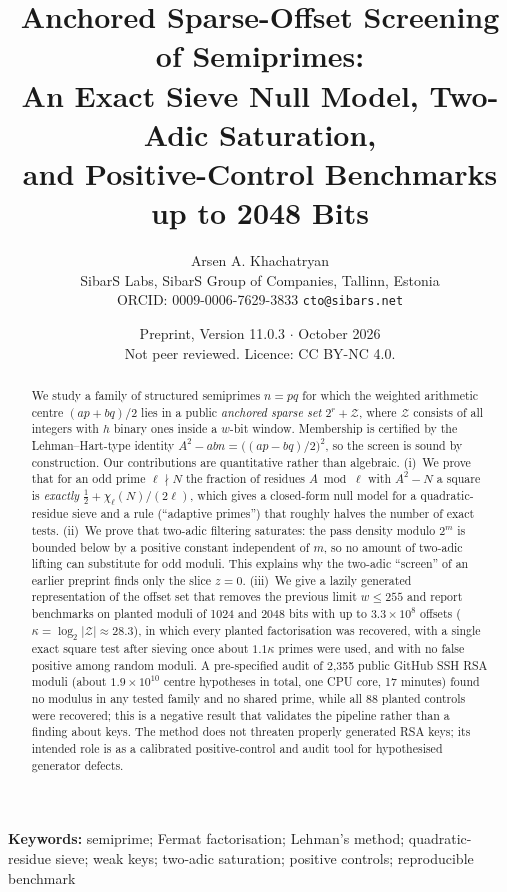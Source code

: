 \documentclass[11pt,a4paper]{article}
\title{\textbf{Anchored Sparse-Offset Screening of Semiprimes:\\
An Exact Sieve Null Model, Two-Adic Saturation,\\
and Positive-Control Benchmarks up to 2048 Bits}}
\author{Arsen A. Khachatryan\\
\small SibarS Labs, SibarS Group of Companies, Tallinn, Estonia\\
\small ORCID: 0009-0006-7629-3833 \quad \texttt{cto@sibars.net}}
\date{Preprint, Version 11.0.3 \quad $\cdot$ \quad 4 October 2026\\[2pt]
\small Not peer reviewed. Licence: CC BY-NC 4.0.}
\begin{document}
\maketitle


\begin{abstract}
We study a family of structured semiprimes $n=pq$ for which the weighted arithmetic centre $(ap+bq)/2$ lies in a public \emph{anchored sparse set} $2^r+\mathcal Z$, where $\mathcal Z$ consists of all integers with $h$ binary ones inside a $w$-bit window. Membership is certified by the Lehman--Hart-type identity $A^2-abn=\bigl((ap-bq)/2\bigr)^2$, so the screen is sound by construction. Our contributions are quantitative rather than algebraic. (i)~We prove that for an odd prime $\ell\nmid N$ the fraction of residues $A \bmod \ell$ with $A^2-N$ a square is \emph{exactly} $\tfrac12+\chi_\ell(N)/(2\ell)$, which gives a closed-form null model for a quadratic-residue sieve and a rule (``adaptive primes'') that roughly halves the number of exact tests. (ii)~We prove that two-adic filtering saturates: the pass density modulo $2^m$ is bounded below by a positive constant independent of $m$, so no amount of two-adic lifting can substitute for odd moduli. This explains why the two-adic ``screen'' of an earlier preprint finds only the slice $z=0$. (iii)~We give a lazily generated representation of the offset set that removes the previous limit $w\le 255$ and report benchmarks on planted moduli of 1024 and 2048 bits with up to $3.3\times10^{8}$ offsets ($\kappa=\log_2|\mathcal Z|\approx 28.3$), in which every planted factorisation was recovered, with a single exact square test after sieving once about $1.1\kappa$ primes were used, and with no false positive among random moduli. A pre-specified audit of 2{,}355 public GitHub SSH RSA moduli (about $1.9\times10^{10}$ centre hypotheses in total, one CPU core, 17 minutes) found no modulus in any tested family and no shared prime, while all 88 planted controls were recovered; this is a negative result that validates the pipeline rather than a finding about keys. The method does not threaten properly generated RSA keys; its intended role is as a calibrated positive-control and audit tool for hypothesised generator defects.
\end{abstract}

\noindent\textbf{Keywords:} semiprime; Fermat factorisation; Lehman's method; quadratic-residue sieve; weak keys; two-adic saturation; positive controls; reproducible benchmark
\end{document}
